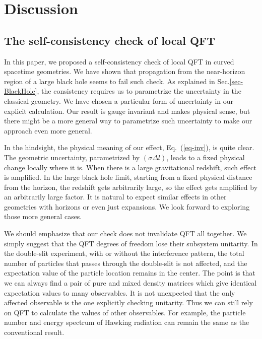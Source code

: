 \documentclass[aps,showpacs,onecolumn,floats,prd,superscriptaddress,nofootinbib]{revtex4-1}
\begin{document}
\section{Discussion}
\label{sec-dis}

\subsection{The self-consistency check of local QFT}

In this paper, we proposed a self-consistency check of local QFT in curved spacetime geometries.
We have shown that propagation from the near-horizon region of a large black hole seems to fail such check.
As explained in Sec.\ref{sec-BlackHole}, the consistency requires us to parametrize the uncertainty in the classical geometry.
We have chosen a particular form of uncertainty in our explicit calculation.
Our result is gauge invariant and makes physical sense, but there might be a more general way to parametrize such uncertainty to make our approach even more general.

In the hindsight, the physical meaning of our effect, Eq.~(\ref{eq-inv}), is quite clear.
The geometric uncertainty, parametrized by $(\sigma\Delta l)$, leads to a fixed physical change locally where it is.
When there is a large gravitational redshift, such effect is amplified.
In the large black hole limit, starting from a fixed physical distance from the horizon, the redshift gets arbitrarily large, so the effect gets amplified by an arbitrarily large factor.
It is natural to expect similar effects in other geometries with horizons or even just expansions.
We look forward to exploring those more general cases.

We should emphasize that our check does not invalidate QFT all together.
We simply suggest that the QFT degrees of freedom lose their subsystem unitarity.
In the double-slit experiment, with or without the interference pattern, the total number of particles that passes through the double-slit is not affected, and the expectation value of the particle location remains in the center.
The point is that we can always find a pair of pure and mixed density matrices which give identical expectation values to many observables.
It is not unexpected that the only affected observable is the one explicitly checking unitarity.
Thus we can still rely on QFT to calculate the values of other observables.
For example, the particle number and energy spectrum of Hawking radiation can remain the same as the conventional result.
\end{document}

